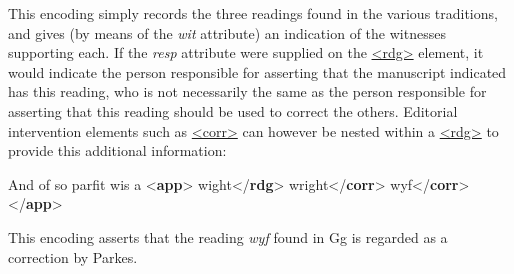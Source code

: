 This encoding simply records the three readings found in the various traditions, and gives (by means of the {\itshape wit} attribute) an indication of the witnesses supporting each. If the {\itshape resp} attribute were supplied on the \hyperref[TEI.rdg]{<rdg>} element, it would indicate the person responsible for asserting that the manuscript indicated has this reading, who is not necessarily the same as the person responsible for asserting that this reading should be used to correct the others. Editorial intervention elements such as \hyperref[TEI.corr]{<corr>} can however be nested within a \hyperref[TEI.rdg]{<rdg>} to provide this additional information: \par\bgroup{}\exampleFont \begin{shaded}\noindent\mbox{}And of so parfit wis a {<\textbf{app}>}\mbox{}\newline 
{}wight{</\textbf{rdg}>}\mbox{}\newline 
{}\mbox{}\newline 
\hspace*{1em}wright{</\textbf{corr}>}\mbox{}\newline 
{}\mbox{}\newline 
{}\mbox{}\newline 
\hspace*{1em}wyf{</\textbf{corr}>}\mbox{}\newline 
{}\mbox{}\newline 
{</\textbf{app}>}\end{shaded}\egroup\par \noindent  This encoding asserts that the reading \textit{wyf} found in Gg is regarded as a correction by Parkes.\par
